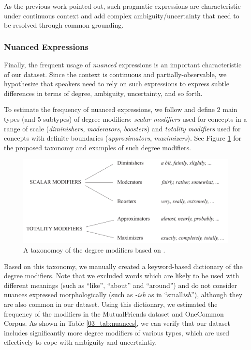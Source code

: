 As the previous work pointed out, such pragmatic expressions are characteristic under continuous context \citep{monroe2017colors} and add complex ambiguity/uncertainty that need to be resolved through common grounding.

\subsubsection{Nuanced Expressions}

Finally, the frequent usage of \emph{nuanced} expressions is an important characteristic of our dataset. Since the context is continuous and partially-observable, we hypothesize that speakers need to rely on such expressions to express subtle differences in terms of degree, ambiguity, uncertainty, and so forth.

To estimate the frequency of nuanced expressions, we follow \citet{paradis_2008} and define 2 main types (and 5 subtypes) of degree modifiers: \textit{scalar modifiers} used for concepts in a range of scale (\textit{diminishers}, \textit{moderators}, \textit{boosters}) and \textit{totality modifiers} used for concepts with definite boundaries (\textit{approximators}, \textit{maximizers}). See Figure \ref{03_fig:degree_modifiers} for the proposed taxonomy and examples of such degree modifiers.

\begin{figure}[th!]
\center
\vspace{2mm}
\includegraphics[width=0.97\columnwidth]{degree_modifiers.pdf}
\vspace{1mm}
\caption{A taxonomoy of the degree modifiers based on \citet{paradis_2008}.
}
\label{03_fig:degree_modifiers}
\end{figure}

Based on this taxonomy, we manually created a keyword-based dictionary of the degree modifiers. Note that we excluded words which are likely to be used with different meanings (such as ``like'', ``about'' and ``around'') and do not consider nuances expressed morphologically (such as \textit{-ish} as in ``small\textit{ish}''), although they are also common in our dataset. Using this dictionary, we estimated the frequency of the modifiers in the MutualFriends dataset and OneCommon Corpus. As shown in Table \ref{03_tab:nuances}, we can verify that our dataset includes significantly more degree modifiers of various types, which are used effectively to cope with ambiguity and uncertaintiy. \\

